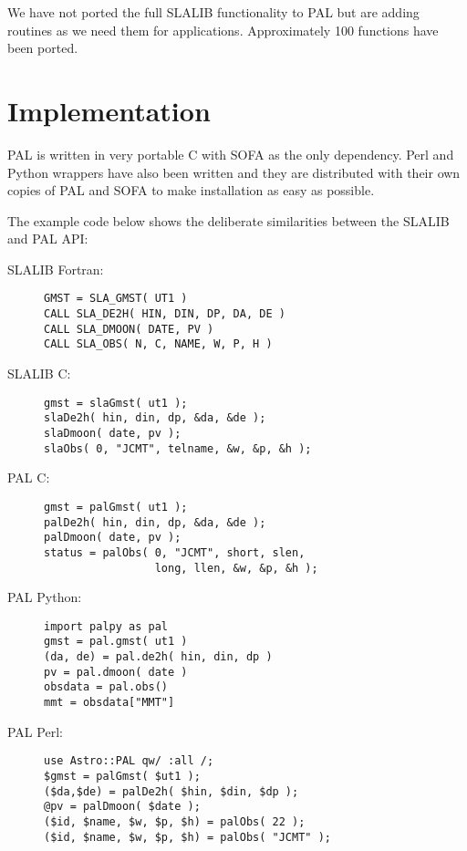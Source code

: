 We have not ported the full SLALIB functionality to PAL but are adding routines as we need them for applications. Approximately 100 functions have been ported.

\section{Implementation}

PAL is written in very portable C with SOFA as the only dependency. Perl and Python wrappers have also been written and they are distributed with their own copies of PAL and SOFA to make installation as easy as possible.

The example code below shows the deliberate similarities between the SLALIB and PAL API:

\newpage
\begin{description}

\item[SLALIB Fortran:] \mbox{}

\begin{verbatim}
GMST = SLA_GMST( UT1 )
CALL SLA_DE2H( HIN, DIN, DP, DA, DE )
CALL SLA_DMOON( DATE, PV )
CALL SLA_OBS( N, C, NAME, W, P, H )
\end{verbatim}

\item[SLALIB C:] \mbox{}

\begin{verbatim}
gmst = slaGmst( ut1 );
slaDe2h( hin, din, dp, &da, &de );
slaDmoon( date, pv );
slaObs( 0, "JCMT", telname, &w, &p, &h );
\end{verbatim}

\item[PAL C:] \mbox{}

\begin{verbatim}
gmst = palGmst( ut1 );
palDe2h( hin, din, dp, &da, &de );
palDmoon( date, pv );
status = palObs( 0, "JCMT", short, slen,
                 long, llen, &w, &p, &h );
\end{verbatim}

\item[PAL Python:] \mbox{}

\begin{verbatim}
import palpy as pal
gmst = pal.gmst( ut1 )
(da, de) = pal.de2h( hin, din, dp )
pv = pal.dmoon( date )
obsdata = pal.obs()
mmt = obsdata["MMT"]
\end{verbatim}

\item[PAL Perl:] \mbox{}

\begin{verbatim}
use Astro::PAL qw/ :all /;
$gmst = palGmst( $ut1 );
($da,$de) = palDe2h( $hin, $din, $dp );
@pv = palDmoon( $date );
($id, $name, $w, $p, $h) = palObs( 22 );
($id, $name, $w, $p, $h) = palObs( "JCMT" );

\end{verbatim}

\end{description}


